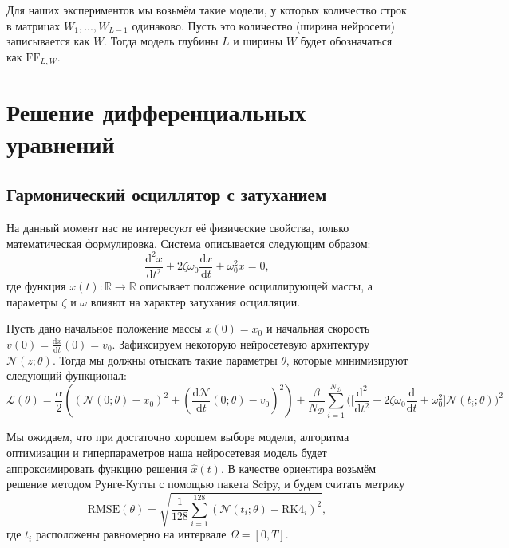 \documentclass[a4paper, 12pt]{article}
\begin{document}
Для наших экспериментов мы возьмём такие модели, у которых количество строк в матрицах $W_1, ..., W_{L-1}$ одинаково. Пусть это количество (ширина нейросети) записывается как $W$. Тогда модель глубины $L$ и ширины $W$ будет обозначаться как $\mathrm{FF}_{L, W}$.

\section{Решение дифференциальных уравнений} \label{section:diffeqsolving}

\subsection{Гармонический осциллятор с затуханием} \label{subsection:oscillator}

На данный момент нас не интересуют её физические свойства, только математическая формулировка. Система описывается следующим образом:
\begin{equation} \label{eq:oscillator:diffeq}
    \frac{\mathrm{d}^2 x}{\mathrm{d} t^2} + 2\zeta \omega_0\frac {\mathrm {d} x}{\mathrm {d} t} + \omega _0^2x = 0,
\end{equation}
где функция $x(t) : \mathbb{R} \to \mathbb{R}$ описывает положение осциллирующей массы, а параметры $\zeta$ и $\omega$ влияют на характер затухания осцилляции.

Пусть дано начальное положение массы $x(0) = x_0$ и начальная скорость $v(0) = \frac{\mathrm{d} x}{\mathrm{d} t}(0) = v_0$. Зафиксируем некоторую нейросетевую архитектуру $\mathcal{N}(z; \theta)$. Тогда мы должны отыскать такие параметры $\theta$, которые минимизируют следующий функционал:
\begin{equation*}
    \mathcal{L}(\theta) = \frac{\alpha}{2}((\mathcal{N}(0; \theta) - x_0)^2 + (\frac{\mathrm{d}\mathcal{N}}{\mathrm{d}t}(0; \theta) - v_0)^2) + \frac{\beta}{N_{\mathcal{D}}} \sum_{i = 1}^{N_{\mathcal{D}}} \Big(\Big[\frac{\mathrm{d}^2}{\mathrm{d} t^2} + 2\zeta \omega_0\frac {\mathrm {d}}{\mathrm {d} t} + \omega _0^2\Big]\mathcal{N}(t_i; \theta)\Big)^2
\end{equation*}

Мы ожидаем, что при достаточно хорошем выборе модели, алгоритма оптимизации и гиперпараметров наша нейросетевая модель будет аппроксимировать функцию решения $\hat{x}(t)$. В качестве ориентира возьмём решение методом Рунге-Кутты с помощью пакета Scipy, и будем считать метрику
$$
\mathrm{RMSE}(\theta) = \sqrt{\frac{1}{128}\sum_{i=1}^{128}(\mathcal{N}(t_i;\theta) - \mathrm{RK4}_i)^2},
$$
где $t_i$ расположены равномерно на интервале $\Omega = [0, T]$.
\end{document}
